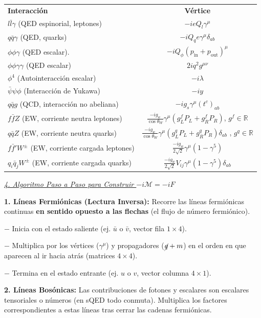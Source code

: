 {

\centering
\begin{tabular}{lc}
\hline
\textbf{Interacción} & \textbf{Vértice} \\[2pt]
$l\bar{l}\gamma$ (QED espinorial, leptones) & $-ieQ_l\gamma^\mu$      \\[2pt]
$q\bar{q}\gamma$ (QED, quarks) & $-iQ_q e\gamma^\mu\delta_{ab}$ \\[2pt]
$\phi\phi\gamma$ (QED escalar). & $-iQ_\phi(p_{\text{in}} + p_{\text{out}})^\mu $\\[2pt]
$\phi\phi\gamma\gamma$ (QED escalar) & $2iq^2 g^{\mu\nu}$  \\[2pt]
$\phi^4$ (Autointeracción escalar) & $-i\lambda$ \\[2pt]
$\bar{\psi}\psi\phi$ (Interacción de Yukawa) & $-iy$ \\[2pt]
$q\bar{q}g$ (QCD, interacción no abeliana) & $-ig_s \gamma^\mu (t^c)_{ab}$ \\[2pt]
$f\bar{f}Z$ (EW, corriente neutra leptones) & $\frac{-ig_w}{\cos\theta_W}\gamma^\mu (g^f_L P_L + g^f_R P_R)$, $g^f \in \mathbb{R}$ \\[2pt]
$q\bar{q}Z$ (EW, corriente neutra quarks) & $\frac{-ig_w}{\cos\theta_W}\gamma^\mu (g^q_L P_L + g^q_R P_R)\delta_{ab}$ , $g^q \in \mathbb{R}$\\[2pt]
$f\bar{f}'W^\pm$ (EW, corriente cargada leptones)& $\frac{-ig_w}{2\sqrt{2}}\gamma^\mu(1 - \gamma^5)$ \\[2pt]
$q_i\bar{q}_jW^\pm$ (EW, corriente cargada quarks) & $\frac{-i g_w}{2\sqrt{2}} V_{ij} \gamma^\mu (1 - \gamma^5) \delta_{ab}$ \\
\hline
\end{tabular}

}


\underline{\textit{4. Algoritmo Paso a Paso para Construir $-i\mathcal{M}=-iF$}}

\textbf{1. Líneas Fermiónicas (Lectura Inversa):} Recorre las líneas fermiónicas continuas \textbf{en sentido opuesto a las flechas} (el flujo de número fermiónico).

$-$ Inicia con el estado saliente (ej. $\bar{u}$ o $\bar{v}$, vector fila $1 \times 4$).

$-$ Multiplica por los vértices ($\gamma^\mu$) y propagadores ($\cancel{q}+m$) en el orden en que aparecen al ir hacia atrás (matrices $4 \times 4$).

$-$ Termina en el estado entrante (ej. $u$ o $v$, vector columna $4 \times 1$).

\textbf{2. Líneas Bosónicas:}  Las contribuciones de fotones y escalares son escalares tensoriales o números (en sQED todo conmuta). Multiplica los factores correspondientes a estas líneas tras cerrar las cadenas fermiónicas.


